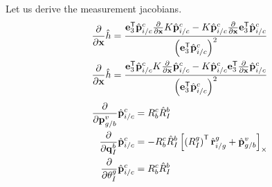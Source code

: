 Let us derive the measurement jacobians.
\begin{align}
  \frac{\partial}{\partial \x} \hat{h} &= \frac{\e_3^\transpose \hat{\vect{p}}_{i/c}^c
  \frac{\partial}{\partial \x} K \hat{\vect{p}}_{i/c}^c - K \hat{\vect{p}}_{i/c}^c
  \frac{\partial}{\partial \x} \e_3^\transpose \hat{\vect{p}}_{i/c}^c}{\left(
\e_3^\transpose \hat{\vect{p}}_{i/c}^c \right)^2 } \\
  \frac{\partial}{\partial \x} \hat{h} &= \frac{\e_3^\transpose \hat{\vect{p}}_{i/c}^c
  K \frac{\partial}{\partial \x} \hat{\vect{p}}_{i/c}^c - K \hat{\vect{p}}_{i/c}^c
  \e_3^\transpose \frac{\partial}{\partial \x} \hat{\vect{p}}_{i/c}^c}{\left(
\e_3^\transpose \hat{\vect{p}}_{i/c}^c \right)^2 }
\end{align}
\begin{align}
  \frac{\partial}{\partial \vect{p}_{g/b}^v} \hat{\vect{p}}_{i/c}^c &=
  R_b^c \hat{R}_I^b \\
  \frac{\partial}{\partial \vect{q}_{I}^b} \hat{\vect{p}}_{i/c}^c &=
  -R_b^c \hat{R}_I^b \skewmat{ \left( R_I^g \right)^\transpose
  \hat{\vect{r}}_{i/g}^g + \hat{\vect{p}}_{g/b}^v } \\
  \frac{\partial}{\partial \theta_I^g} \hat{\vect{p}}_{i/c}^c &=
  R_b^c \hat{R}_I^b \\
\end{align}


